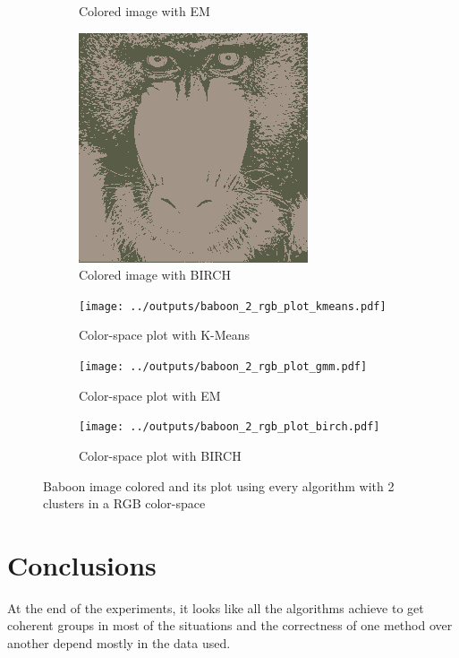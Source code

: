 \documentclass[sigconf,authorversion]{acmart}
\begin{document}
\begin{figure}[hbtp]
\begin{subfigure}[b]{0.25\textwidth}
      \caption{Colored image with EM}
      \label{subfig:baboon_rgb_gmm}
  \end{subfigure}
  \hspace{0.05\textwidth}
  \begin{subfigure}[b]{0.25\textwidth}
      \includegraphics[width=\textwidth]{../outputs/baboon_2_rgb_colored_birch.png}
      \caption{Colored image with BIRCH}
      \label{subfig:baboon_rgb_birch}
  \end{subfigure}
  \begin{subfigure}[b]{0.25\textwidth}
      \texttt{[image: ../outputs/baboon\_2\_rgb\_plot\_kmeans.pdf]}
      \caption{Color-space plot with K-Means}
      \label{subfig:p_baboon_rgb_kmeans}
  \end{subfigure}
  \hspace{0.05\textwidth}
  \begin{subfigure}[b]{0.25\textwidth}
      \texttt{[image: ../outputs/baboon\_2\_rgb\_plot\_gmm.pdf]}
      \caption{Color-space plot with EM}
      \label{subfig:p_baboon_rgb_gmm}
  \end{subfigure}
  \hspace{0.05\textwidth}
  \begin{subfigure}[b]{0.25\textwidth}
      \texttt{[image: ../outputs/baboon\_2\_rgb\_plot\_birch.pdf]}
      \caption{Color-space plot with BIRCH}
      \label{subfig:p_baboon_rgb_birch}
  \end{subfigure}
  \caption{Baboon image colored and its plot using every algorithm with 2 clusters in a RGB color-space}
  \label{fig:baboon_2_rgb}
\end{figure}

\section{Conclusions}
At the end of the experiments, it looks like all the algorithms achieve to get coherent groups in most of the situations and the correctness of one method over another depend mostly in the data used. 



\end{document}
